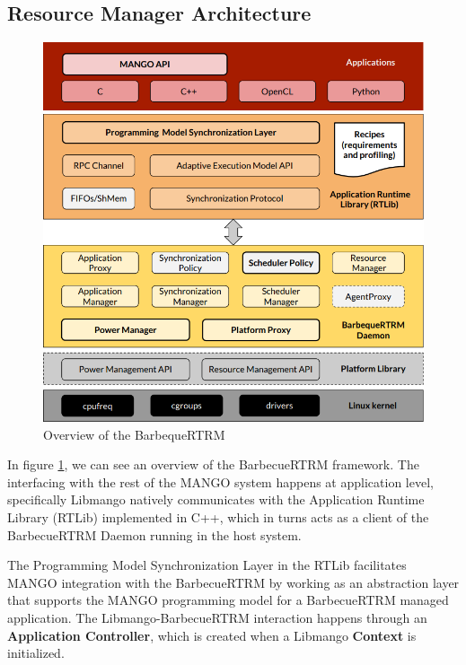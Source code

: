 \subsection{Resource Manager Architecture}

\begin{figure}[ht]
    \centering
    \includegraphics[width=\textwidth]{img/barbecue-arch.png}
    \captionsetup{justification=centering}
    \caption{Overview of the BarbequeRTRM}
    \label{fig:barbecue-arch}
\end{figure}

In figure \ref{fig:barbecue-arch}, we can see an overview of the BarbecueRTRM framework. The interfacing with the rest of the MANGO system happens at application level, specifically Libmango natively communicates with the Application Runtime Library (RTLib) implemented in C++, which in turns acts as a client of the BarbecueRTRM Daemon running in the host system.

The Programming Model Synchronization Layer in the RTLib facilitates MANGO integration with the BarbecueRTRM by working as an abstraction layer that supports the MANGO programming model for a BarbecueRTRM managed application.
The Libmango-BarbecueRTRM interaction happens through an \textbf{Application Controller}, which is created when a Libmango \textbf{Context} is initialized.

